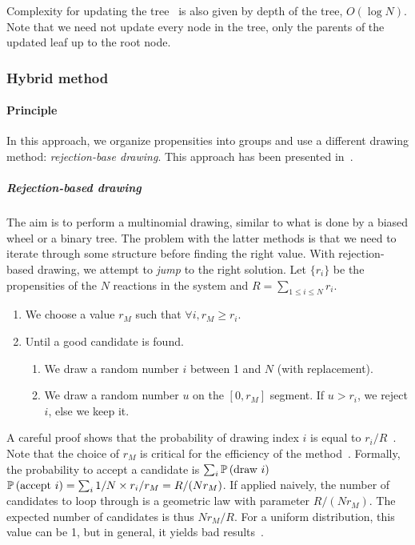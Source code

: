 Complexity for updating the tree~ is also given by depth of the tree, $O(\log N)$. Note that we need not update every node in the tree, only the parents of the updated leaf up to the root node.


\subsubsection {Hybrid method}

\paragraph {Principle}

In this approach, we organize propensities into groups and use a different drawing method: \emph{rejection-base drawing}. This approach has been presented in~\citet{slepoy_constant-time_2008}.

\subparagraph{Rejection-based drawing} The aim is to perform a multinomial drawing, similar to what is done by a biased wheel or a binary tree. The problem with the latter methods is that we need to iterate through some structure before finding the right value. With rejection-based drawing, we attempt to \emph{jump} to the right solution. Let $\{r_i\}$ be the propensities of the $N$ reactions in the system and $R = \sum_{1 \leq i \leq N} r_i$.
\begin{enumerate}
\item We choose a value $r_M$ such that $\forall i, r_M \geq r_i$.
\item Until a good candidate is found.
  \begin{enumerate}
  \item We draw a random number $i$ between 1 and $N$ (with replacement).
  \item We draw a random number $u$ on the $[0, r_M]$ segment. If $u > r_i$, we reject $i$, else we keep it.
  \end{enumerate}
\end{enumerate}

A careful proof shows that the probability of drawing index $i$ is equal to $r_i / R$~\citep{serebrinsky_physical_2011}. Note that the choice of $r_M$ is critical for the efficiency of the method~. Formally, the probability to accept a candidate is $\sum_i\mathbb{P}\left(\textrm{draw }i\right)$ $\mathbb{P}\left(\textrm{accept }i\right) = \sum_i1/N \times r_i/r_M = R/(Nr_M)$. If applied naively, the number of candidates to loop through is a geometric law with parameter $R/(Nr_M)$. The expected number of candidates is thus $Nr_M/R$. For a uniform distribution, this value can be 1, but in general, it yields bad results~.

